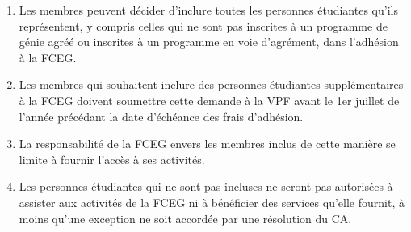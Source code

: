 \begin{enumerate}
 \item Les membres peuvent décider d'inclure toutes les personnes étudiantes qu'ils représentent, y compris celles qui ne sont pas inscrites à un programme de génie agréé ou inscrites à un programme en voie d'agrément, dans l'adhésion à la FCEG.
 \item Les membres qui souhaitent inclure des personnes étudiantes supplémentaires à la FCEG doivent soumettre cette demande à la VPF avant le 1er juillet de l'année précédant la date d'échéance des frais d'adhésion.
 \item La responsabilité de la FCEG envers les membres inclus de cette manière se limite à fournir l'accès à ses activités.
 \item Les personnes étudiantes qui ne sont pas incluses ne seront pas autorisées à assister aux activités de la FCEG ni à bénéficier des services qu'elle fournit, à moins qu'une exception ne soit accordée par une résolution du CA.
\end{enumerate}
